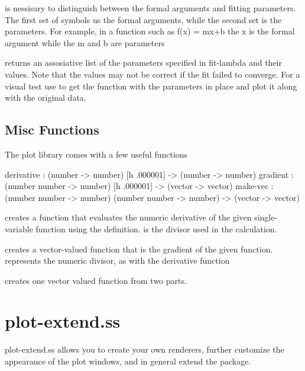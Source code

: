 \documentclass{article}
\begin{document}
{{{ is nessisary to distinguish between the formal arguments and fitting parameters. The first set of symbols us the formal arguments, while the second set is the parameters. For example, in a function such as f(x) = mx+b the x is the formal argument while the m and b are parameters


 returns an assosiative list of the parameters specified  in fit-lambda and their values. Note that the values may not be correct if the fit failed to converge. For a visual test use  to get the function with the parameters in place and plot it along with the original data.

\subsection{Misc Functions}


The plot library comes with a few useful functions


\begin{schemedisplay}

derivative      : (number -> number) [h .000001] -> (number -> number)   
gradient : (number number -> number) [h .000001] -> (vector -> vector)
make-vec : (number number -> number) (number number -> number) -> (vector -> vector) 
\end{schemedisplay}

 creates a function that evaluates the numeric derivative of the given  single-variable function using the definition.  is the divisor used in the calculation.


 creates a vector-valued function that is the gradient of the given function. represents the numeric divisor, as with the derivative function


 creates one vector valued function from two parts.

\pagebreak

\section{plot-extend.ss}


plot-extend.ss allows you to create your own renderers, further customize the appearance of the plot windows,
     and in general extend the package.

\subsection{\scheme{2d-view%

}}}}}
\end{document}
